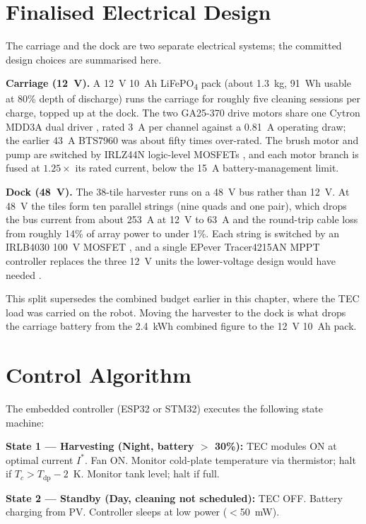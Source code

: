 \documentclass[12pt,a4paper]{report}   %
\begin{document}
\section{Finalised Electrical Design}

The carriage and the dock are two separate electrical systems; the committed design
choices are summarised here.

\textbf{Carriage (12~V).} A 12~V 10~Ah LiFePO\textsubscript{4} pack (about 1.3~kg, 91~Wh
usable at 80\% depth of discharge) runs the carriage for roughly five cleaning sessions
per charge, topped up at the dock. The two GA25-370 drive motors share one Cytron MDD3A
dual driver \cite{cytronmdd3a}, rated 3~A per channel against a 0.81~A operating draw; the
earlier 43~A BTS7960 was about fifty times over-rated. The brush motor and pump are
switched by IRLZ44N logic-level MOSFETs \cite{irlz44nds}, and each motor branch is fused
at $1.25\times$ its rated current, below the 15~A battery-management limit.

\textbf{Dock (48~V).} The 38-tile harvester runs on a 48~V bus rather than 12~V. At 48~V
the tiles form ten parallel strings (nine quads and one pair), which drops the bus current
from about 253~A at 12~V to 63~A and the round-trip cable loss from roughly 14\% of array
power to under 1\%. Each string is switched by an IRLB4030 100~V MOSFET \cite{irlb4030ds},
and a single EPever Tracer4215AN MPPT controller replaces the three 12~V units the
lower-voltage design would have needed \cite{epever2023tracer42}.

This split supersedes the combined budget earlier in this chapter, where the TEC load was
carried on the robot. Moving the harvester to the dock is what drops the carriage battery
from the 2.4~kWh combined figure to the 12~V 10~Ah pack.

\section{Control Algorithm}

The embedded controller (ESP32 or STM32) executes the following state machine:

\textbf{State 1 --- Harvesting (Night, battery $>$ 30\%):} TEC modules ON at optimal current
$I^*$. Fan ON. Monitor cold-plate temperature via thermistor; halt if $T_c > T_{\mathrm{dp}} - 2$~K.
Monitor tank level; halt if full.

\textbf{State 2 --- Standby (Day, cleaning not scheduled):} TEC OFF. Battery charging from PV.
Controller sleeps at low power ($<$50~mW).
\end{document}
